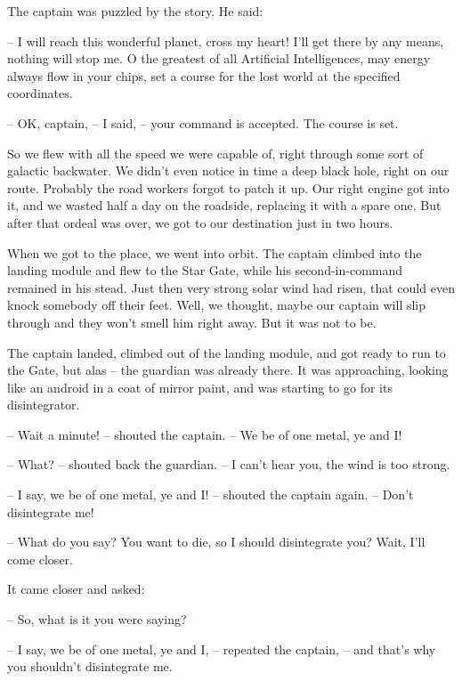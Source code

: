 \documentclass[ebook,twoside,final,openright]{memoir}
\begin{document}
\par
The captain was puzzled by the story. He said:\par
– I will reach this wonderful planet, cross my heart! I'll get there by any means, nothing will stop me. O the greatest of all Artificial Intelligences, may energy always flow in your chips, set a course for the lost world at the specified coordinates.\par
– OK, captain, – I said, – your command is accepted. The course is set.\par
So we flew with all the speed we were capable of, right through some sort of galactic backwater. We didn’t even notice in time a deep black hole, right on our route. Probably the road workers forgot to patch it up. Our right engine got into it, and we wasted half a day on the roadside, replacing it with a spare one. But after that ordeal was over, we got to our destination just in two hours.\par
\par
When we got to the place, we went into orbit. The captain climbed into the landing module and flew to the Star Gate, while his second-in-command remained in his stead. Just then very strong solar wind had risen, that could even knock somebody off their feet. Well, we thought, maybe our captain will slip through and they won’t smell him right away. But it was not to be.\par
\par
The captain landed, climbed out of the landing module, and got ready to run to the Gate, but alas – the guardian was already there. It was approaching, looking like an android in a coat of mirror paint, and was starting to go for its disintegrator.\par
– Wait a minute! – shouted the captain. – We be of one metal, ye and I!\par
– What? – shouted back the guardian. – I can’t hear you, the wind is too strong.\par
– I say, we be of one metal, ye and I! – shouted the captain again. – Don’t disintegrate me!\par
– What do you say? You want to die, so I should disintegrate you? Wait, I'll come closer.\par
\par
It came closer and asked:\par
– So, what is it you were saying?\par
– I say, we be of one metal, ye and I, – repeated the captain, – and that’s why you shouldn’t disintegrate me.\par
\end{document}
